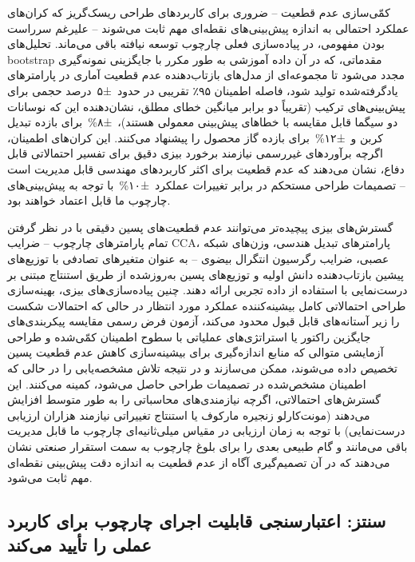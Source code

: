 \documentclass[12pt, a4paper]{article}
\begin{document}
کمّی‌سازی عدم قطعیت – ضروری برای کاربردهای طراحی ریسک‌گریز که کران‌های عملکرد احتمالی به اندازه پیش‌بینی‌های نقطه‌ای مهم ثابت می‌شوند – علیرغم سرراست بودن مفهومی، در پیاده‌سازی فعلی چارچوب توسعه نیافته باقی می‌ماند. تحلیل‌های bootstrap مقدماتی، که در آن داده آموزشی به طور مکرر با جایگزینی نمونه‌گیری مجدد می‌شود تا مجموعه‌ای از مدل‌های بازتاب‌دهنده عدم قطعیت آماری در پارامترهای یادگرفته‌شده تولید شود، فاصله اطمینان ۹۵٪ تقریبی در حدود ±۵ درصد حجمی برای پیش‌بینی‌های ترکیب (تقریباً دو برابر میانگین خطای مطلق، نشان‌دهنده این که نوسانات دو سیگما قابل مقایسه با خطاهای پیش‌بینی معمولی هستند)، ±۸\% برای بازده تبدیل کربن و ±۱۲\% برای بازده گاز محصول را پیشنهاد می‌کنند. این کران‌های اطمینان، اگرچه برآوردهای غیررسمی نیازمند برخورد بیزی دقیق برای تفسیر احتمالاتی قابل دفاع، نشان می‌دهند که عدم قطعیت برای اکثر کاربردهای مهندسی قابل مدیریت است – تصمیمات طراحی مستحکم در برابر تغییرات عملکرد ±۱۰\% با توجه به پیش‌بینی‌های چارچوب ما قابل اعتماد خواهند بود.

گسترش‌های بیزی پیچیده‌تر می‌توانند عدم قطعیت‌های پسین دقیقی با در نظر گرفتن تمام پارامترهای چارچوب – ضرایب CCA، پارامترهای تبدیل هندسی، وزن‌های شبکه عصبی، ضرایب رگرسیون انتگرال بیضوی – به عنوان متغیرهای تصادفی با توزیع‌های پیشین بازتاب‌دهنده دانش اولیه و توزیع‌های پسین به‌روزشده از طریق استنتاج مبتنی بر درست‌نمایی با استفاده از داده تجربی ارائه دهند. چنین پیاده‌سازی‌های بیزی، بهینه‌سازی طراحی احتمالاتی کامل بیشینه‌کننده عملکرد مورد انتظار در حالی که احتمالات شکست را زیر آستانه‌های قابل قبول محدود می‌کند، آزمون فرض رسمی مقایسه پیکربندی‌های جایگزین راکتور یا استراتژی‌های عملیاتی با سطوح اطمینان کمّی‌شده و طراحی آزمایشی متوالی که منابع اندازه‌گیری برای بیشینه‌سازی کاهش عدم قطعیت پسین تخصیص داده می‌شوند، ممکن می‌سازند و در نتیجه تلاش مشخصه‌یابی را در حالی که اطمینان مشخص‌شده در تصمیمات طراحی حاصل می‌شود، کمینه می‌کنند. این گسترش‌های احتمالاتی، اگرچه نیازمندی‌های محاسباتی را به طور متوسط افزایش می‌دهند (مونت‌کارلو زنجیره مارکوف یا استنتاج تغییراتی نیازمند هزاران ارزیابی درست‌نمایی) با توجه به زمان ارزیابی در مقیاس میلی‌ثانیه‌ای چارچوب ما قابل مدیریت باقی می‌مانند و گام طبیعی بعدی را برای بلوغ چارچوب به سمت استقرار صنعتی نشان می‌دهند که در آن تصمیم‌گیری آگاه از عدم قطعیت به اندازه دقت پیش‌بینی نقطه‌ای مهم ثابت می‌شود.

\subsection{سنتز: اعتبارسنجی قابلیت اجرای چارچوب برای کاربرد عملی را تأیید می‌کند}
\end{document}
